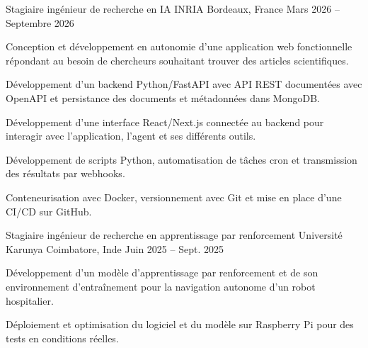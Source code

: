 
\begin{cventries}
  \cventry
    {Stagiaire ingénieur de recherche en IA}
    {INRIA}
    {Bordeaux, France}
    {Mars 2026 -- Septembre 2026}
    {
      \begin{cvitems}
        \item {Conception et développement en autonomie d’une application web fonctionnelle répondant au besoin de chercheurs souhaitant trouver des articles scientifiques.}
        \item {Développement d’un backend Python/FastAPI avec API REST documentées avec OpenAPI et persistance des documents et métadonnées dans MongoDB.}
        \item {Développement d’une interface React/Next.js connectée au backend pour interagir avec l’application, l’agent et ses différents outils.}
        \item {Développement de scripts Python, automatisation de tâches cron et transmission des résultats par webhooks.}
        \item {Conteneurisation avec Docker, versionnement avec Git et mise en place d’une CI/CD sur GitHub.}
      \end{cvitems}
    }

  \cventry
    {Stagiaire ingénieur de recherche en apprentissage par renforcement}
    {Université Karunya}
    {Coimbatore, Inde}
    {Juin 2025 -- Sept. 2025}
    {
      \begin{cvitems}
        \item {Développement d’un modèle d’apprentissage par renforcement et de son environnement d’entraînement pour la navigation autonome d’un robot hospitalier.}
        \item {Déploiement et optimisation du logiciel et du modèle sur Raspberry Pi pour des tests en conditions réelles.}
      \end{cvitems}
    }
\end{cventries}
